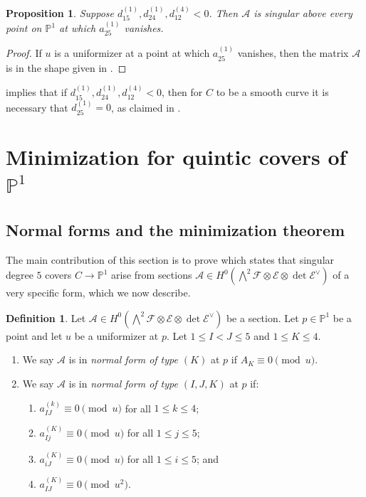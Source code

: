 \documentclass[11pt]{amsart}
\numberwithin{theorem}{section}
\numberwithin{equation}{section}
\newtheorem{proposition}[theorem]{Proposition}
\theoremstyle{definition}\newtheorem{defn}[theorem]{Definition}
\theoremstyle{definition}\newtheorem{remark}[theorem]{Remark}
\theoremstyle{definition}\newtheorem{question}[theorem]{Question}
\theoremstyle{definition}\newtheorem{problem}[theorem]{Problem}
\newcommand{\PP}{\mathbb{P}}
\newcommand{\cE}{\mathcal{E}}
\newcommand{\cF}{\mathcal{F}}
\newcommand{\cA}{\mathcal{A}}
\newcommand{\I}{I}
\newcommand{\J}{J}
\newcommand{\K}{K}
\begin{document}
\begin{proposition}
\label{prop:cond2}
Suppose $d^{(1)}_{15}, d^{(1)}_{24}, d^{(4)}_{12} < 0$. Then $\cA$ is singular above every point on $\PP^1$ at which $a^{(1)}_{25}$ vanishes.
\end{proposition}
\begin{proof}
If $u$ is a uniformizer at a point at which $a^{(1)}_{25}$ vanishes, then the matrix $\cA$ is in the shape given in .
\end{proof}

 implies that if $d^{(1)}_{15}, d^{(1)}_{24}, d^{(4)}_{12} < 0$, then for $C$ to be a smooth curve it is necessary that $d^{(1)}_{25} = 0$, as claimed in . 

\section{Minimization for quintic covers of \texorpdfstring{$\PP^1$}{P{\textasciicircum}1}}
\label{sec:minimization}

\subsection{Normal forms and the minimization theorem}
The main contribution of this section is to prove  which states that singular degree $5$ covers $C \to \PP^1$ arise from sections $\cA \in H^0( \bigwedge\nolimits^2 \cF \otimes \cE \otimes \det \cE^{\vee} )$ of a very specific form, which we now describe.

\begin{defn}
\label{def:normal-form}
Let $\cA \in H^0( \bigwedge\nolimits^2 \cF \otimes \cE \otimes \det \cE^{\vee} )$ be a section. Let $p \in \PP^1$ be a point and let $u$ be a uniformizer at $p$. Let $1 \leq \I < \J \leq 5$ and $1 \leq \K \leq 4$. 
\begin{enumerate}[label=(\Alph*)]
    \item 
    \label{def:k-normal-form}
    We say $\cA$ is in \emph{normal form of type $(\K)$} at $p$ if $A_{\K} \equiv 0 \pmod{u}$.
    
    \item \label{def:ijk-normal-form}
    We say $\cA$ is in \emph{normal form of type $(\I,\J,\K)$} at $p$ if:
    \begin{enumerate}[label=(\roman*)]
        \item \label{nf:2} $a^{(k)}_{\I\J} \equiv 0 \pmod{u}$ for all $1 \leq k \leq 4$; 
        \item \label{nf:3} $a^{(\K)}_{\I j} \equiv 0 \pmod{u}$ for all $1 \leq j \leq 5$; 
        \item \label{nf:4} $a^{(\K)}_{i\J} \equiv 0 \pmod{u}$ for all $1 \leq i \leq 5$; and
        \item \label{nf:1} $a^{(\K)}_{\I\J} \equiv 0 \pmod{u^2}$.
    \end{enumerate}
\end{enumerate}
\end{defn}
\end{document}
